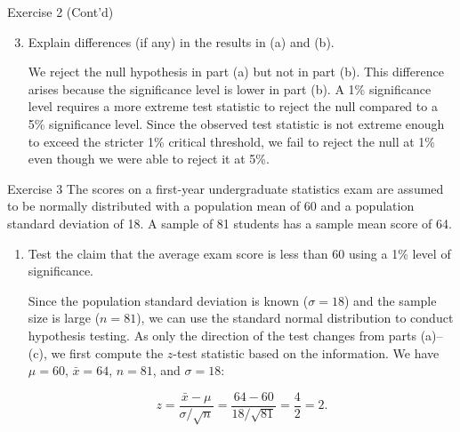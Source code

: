 \documentclass[
  ignorenonframetext,
  aspectratio=43,
]{beamer}
\let\olditem\item
\renewcommand\item{\olditem\justifying}
\begin{document}
\begin{frame}{Exercise 2 (Cont'd)}
\protect\hypertarget{exercise-2-contd-4}{}
\begin{enumerate}
\setcounter{enumi}{2}
\item
  Explain differences (if any) in the results in (a) and (b).

  \pause

  We reject the null hypothesis in part (a) but not in part (b). This
  difference arises because the significance level is lower in part (b).
  A 1\% significance level requires a more extreme test statistic to
  reject the null compared to a 5\% significance level. Since the
  observed test statistic is not extreme enough to exceed the stricter
  1\% critical threshold, we fail to reject the null at 1\% even though
  we were able to reject it at 5\%.
\end{enumerate}
\end{frame}

\begin{frame}{Exercise 3}
\protect\hypertarget{exercise-3}{}
The scores on a first-year undergraduate statistics exam are assumed to
be normally distributed with a population mean of 60 and a population
standard deviation of 18. A sample of 81 students has a sample mean
score of 64.

\begin{enumerate}
\item
  Test the claim that the average exam score is less than 60 using a 1\%
  level of significance.

  \pause

  Since the population standard deviation is known (\(\sigma = 18\)) and
  the sample size is large (\(n = 81\)), we can use the standard normal
  distribution to conduct hypothesis testing. As only the direction of
  the test changes from parts (a)--(c), we first compute the \(z\)-test
  statistic based on the information. We have \(\mu = 60\),
  \(\bar{x} = 64\), \(n = 81\), and \(\sigma = 18\): \vspace{-4pt}

  \pause

  \[
   z = \frac{\bar{x} - \mu}{\sigma / \sqrt{n}}
   = \frac{64 - 60}{18 / \sqrt{81}}
   = \frac{4}{2}
   = 2.
   \]
\end{enumerate}
\end{frame}
\end{document}
